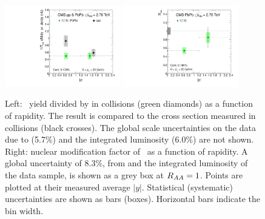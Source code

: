 \begin{figure}[htbp]
  \begin{center}
    \includegraphics[width=0.45\textwidth]{chap_YInPbPbColl2010_figures/upsilon_eta}\hspace{1em}
    \includegraphics[width=0.45\textwidth]{chap_YInPbPbColl2010_figures/upsilon_RAA_eta}
    \caption{Left: \PgUa\ yield divided by \taa in \PbPb collisions
      (green diamonds) as a function of rapidity. The result is
      compared to the cross section measured in \pp collisions (black
      crosses). The global scale uncertainties on the \PbPb data due
      to \taa (5.7\%) and the \pp integrated luminosity (6.0\%) are
      not shown. Right: nuclear modification factor \raa of \PgUa\ as a
      function of rapidity. A global uncertainty of 8.3\%, from \taa
      and the integrated luminosity of the \pp data sample, is shown
      as a grey box at $R_{AA}=1$. Points are plotted at their measured
      average $|y|$. Statistical (systematic) uncertainties are shown
      as bars (boxes). Horizontal bars indicate the bin width.}
    \label{fig:upsilon_eta}
  \end{center}
\end{figure}
